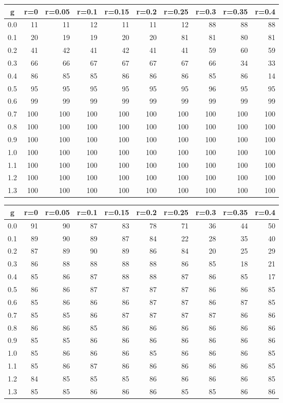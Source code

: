 %
\begin{table}[!tbp]
 \begin{center}
 \begin{tabular}{rrrrrrrrrr}\hline\hline
\multicolumn{1}{c}{g}&\multicolumn{1}{c}{r=0}&\multicolumn{1}{c}{r=0.05}&\multicolumn{1}{c}{r=0.1}&\multicolumn{1}{c}{r=0.15}&\multicolumn{1}{c}{r=0.2}&\multicolumn{1}{c}{r=0.25}&\multicolumn{1}{c}{r=0.3}&\multicolumn{1}{c}{r=0.35}&\multicolumn{1}{c}{r=0.4}\tabularnewline
\hline
0.0& 11& 11& 12& 11& 11& 12& 88& 88& 88\tabularnewline
0.1& 20& 19& 19& 20& 20& 81& 81& 80& 81\tabularnewline
0.2& 41& 42& 41& 42& 41& 41& 59& 60& 59\tabularnewline
0.3& 66& 66& 67& 67& 67& 67& 66& 34& 33\tabularnewline
0.4& 86& 85& 85& 86& 86& 86& 85& 86& 14\tabularnewline
0.5& 95& 95& 95& 95& 95& 95& 96& 95& 95\tabularnewline
0.6& 99& 99& 99& 99& 99& 99& 99& 99& 99\tabularnewline
0.7&100&100&100&100&100&100&100&100&100\tabularnewline
0.8&100&100&100&100&100&100&100&100&100\tabularnewline
0.9&100&100&100&100&100&100&100&100&100\tabularnewline
1.0&100&100&100&100&100&100&100&100&100\tabularnewline
1.1&100&100&100&100&100&100&100&100&100\tabularnewline
1.2&100&100&100&100&100&100&100&100&100\tabularnewline
1.3&100&100&100&100&100&100&100&100&100\tabularnewline
\hline
\end{tabular}

\end{center}

\end{table}

%
\begin{table}[!tbp]
 \begin{center}
 \begin{tabular}{rrrrrrrrrr}\hline\hline
\multicolumn{1}{c}{g}&\multicolumn{1}{c}{r=0}&\multicolumn{1}{c}{r=0.05}&\multicolumn{1}{c}{r=0.1}&\multicolumn{1}{c}{r=0.15}&\multicolumn{1}{c}{r=0.2}&\multicolumn{1}{c}{r=0.25}&\multicolumn{1}{c}{r=0.3}&\multicolumn{1}{c}{r=0.35}&\multicolumn{1}{c}{r=0.4}\tabularnewline
\hline
0.0&91&90&87&83&78&71&36&44&50\tabularnewline
0.1&89&90&89&87&84&22&28&35&40\tabularnewline
0.2&87&89&90&89&86&84&20&25&29\tabularnewline
0.3&86&88&88&88&88&86&85&18&21\tabularnewline
0.4&85&86&87&88&88&87&86&85&17\tabularnewline
0.5&86&86&87&87&87&87&86&86&85\tabularnewline
0.6&85&86&86&86&87&87&86&87&85\tabularnewline
0.7&85&85&86&87&87&87&87&86&86\tabularnewline
0.8&86&86&85&86&86&86&86&86&86\tabularnewline
0.9&85&85&86&86&86&86&86&86&86\tabularnewline
1.0&85&86&86&86&85&86&86&86&85\tabularnewline
1.1&85&86&87&86&86&86&86&86&85\tabularnewline
1.2&84&85&85&85&86&86&86&86&85\tabularnewline
1.3&85&85&86&86&86&85&85&86&86\tabularnewline
\hline
\end{tabular}

\end{center}

\end{table}

